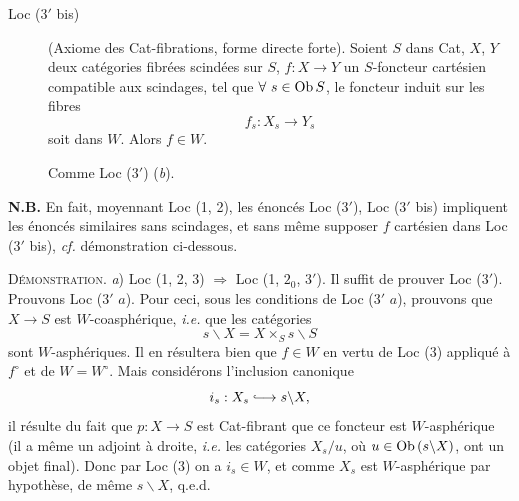 \clearpage


\begin{description}
\item[Loc (3$'$ bis)]  (Axiome des Cat-fibrations, forme directe forte). Soient $S$ dans Cat, $X$, $Y$ deux catégories fibrées scindées sur $S$, $f : X \longrightarrow Y$ un $S$-foncteur cartésien compatible aux scindages, tel que $\forall\ s \in \mathrm{Ob}\, S$, le foncteur induit sur les fibres
\[
f_s : X_s \longrightarrow Y_s
\]
soit dans $W$. Alors $f \in W$.

 Comme Loc ($3'$) (\textit{b}).
\end{description}

\textbf{N.B.} En fait, moyennant Loc (1, 2), les énoncés Loc ($3'$), Loc ($3'$ bis) impliquent les énoncés similaires sans scindages, et sans même supposer $f$ cartésien dans Loc ($3'$ bis), \textit{cf.} démonstration ci-dessous.

\textsc{Démonstration.} \textit{a}) Loc (1, 2, 3) $\Longrightarrow$ Loc (1, $2_0$, $3'$). Il suffit de prouver Loc ($3'$). Prouvons Loc ($3'$ $a$). Pour ceci, sous les conditions de Loc ($3'$ $a$), prouvons que $X \longrightarrow S$ est $W$-coasphérique, \textit{i.e.} que les catégories
\[
s\backslash X = X \times_S s\backslash S
\]
sont $W$-asphériques. Il en résultera bien que $f \in W$ en vertu de Loc (3) appliqué à $f^\circ$ et de $W = W^\circ$. Mais
considérons l’inclusion canonique
\[
i_s : X_s \lhook\joinrel\longrightarrow s\backslash X,
\]
il résulte du fait que $p : X \longrightarrow S$ est Cat-fibrant que ce foncteur est $W$-asphérique (il a même un adjoint à droite, \textit{i.e.} les catégories $X_s/u$, où $u \in \mathrm{Ob}\,(s\backslash X)$, ont un objet final). Donc par Loc (3) on a $i_s \in W$, et comme $X_s$ est $W$-asphérique par hypothèse, de même $s\backslash X$, q.e.d.

